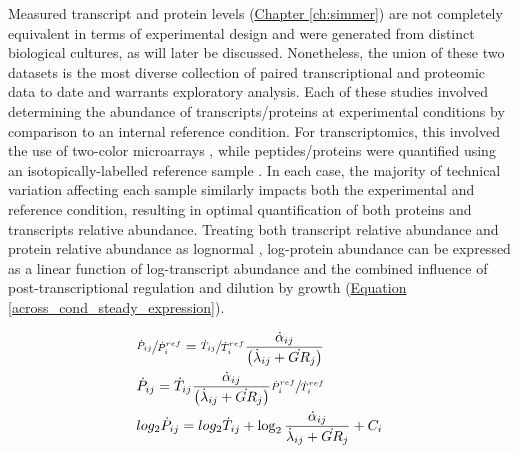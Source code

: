 Measured transcript \cite{Brauer:2008jn} and protein levels (\hyperref[ch:simmer]{Chapter \ref{ch:simmer}}) are not completely equivalent in terms of experimental design and were generated from distinct biological cultures, as will later be discussed. Nonetheless, the union of these two datasets is the most diverse collection of paired transcriptional and proteomic data to date and warrants exploratory analysis.  Each of these studies involved determining the abundance of transcripts/proteins at experimental conditions by comparison to an internal reference condition. For transcriptomics, this involved the use of two-color microarrays \cite{Quackenbush:2002kl}, while peptides/proteins were quantified using an isotopically-labelled reference sample \cite{Ong:2002tf, Costenoble:2011hia}.  In each case, the majority of technical variation affecting each sample similarly impacts both the experimental and reference condition, resulting in optimal quantification of both proteins and transcripts relative abundance. Treating both transcript relative abundance and protein relative abundance as lognormal \cite{Quackenbush:2002kl, Cox:2008ir}, log-protein abundance can be expressed as a linear function of log-transcript abundance and the combined influence of post-transcriptional regulation and dilution by growth (\hyperref[across_cond_steady_expression]{Equation \ref{across_cond_steady_expression}}).

\begin{align}
&\sfrac{\dot{P}_{ij}}{\dot{P}^{ref}_{i}} = \sfrac{\dot{T}_{ij}}{\dot{T}^{ref}_{i}}\frac{\dot{\alpha}_{ij}}{\left(\dot{\lambda}_{ij} + \dot{GR}_{j}\right)}\notag\\
&\dot{P}_{ij} = \dot{T}_{ij}\frac{\dot{\alpha}_{ij}}{\left(\dot{\lambda}_{ij} + \dot{GR}_{j}\right)}\sfrac{\dot{P}^{ref}_{i}}{\dot{T}^{ref}_{i}}\notag\\
&log_{2}\dot{P}_{ij} = log_{2}\dot{T}_{ij} + \log_{2}\frac{\dot{\alpha}_{ij}}{\dot{\lambda}_{ij} + \dot{GR}_{j}} + C_{i}\label{across_cond_steady_expression}
\end{align}


